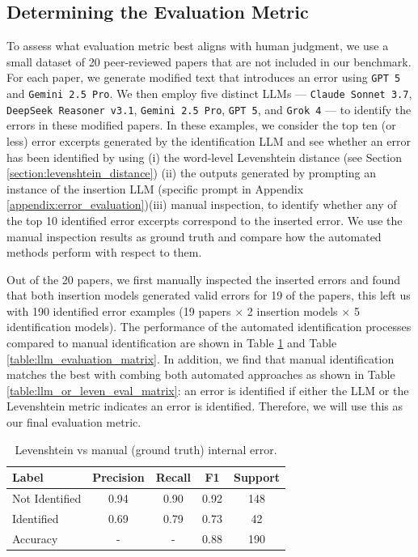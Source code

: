 \documentclass{article}
\newcommand{\gemini}{\texttt{Gemini 2.5 Pro}}
\newcommand{\gpt}{\texttt{GPT 5}}
\newcommand{\grok}{\texttt{Grok 4}}
\newcommand{\deepseek}{\texttt{DeepSeek Reasoner v3.1}}
\begin{document}
\begin{appendix}
\section{Determining the Evaluation Metric}
\label{appendix:preliminary_eval_exp}

To assess what evaluation metric best aligns with human judgment, we use a small dataset of 20 peer-reviewed papers that are not included in our benchmark. For each paper, we generate modified text that introduces an error using \gpt{} and \gemini{}. We then employ five distinct LLMs --- \texttt{Claude Sonnet 3.7}, \deepseek{},  \gemini{}, \gpt{}, and \grok{} --- to identify the errors in these modified papers. In these examples, we consider the top ten (or less) error excerpts generated by the identification LLM and see whether an error has been identified by using (i) the word-level Levenshtein distance (see Section \ref{section:levenshtein_distance}) (ii) the outputs generated by prompting an instance of the insertion LLM (specific prompt in Appendix \ref{appendix:error_evaluation})(iii) manual inspection, to identify whether any of the top 10 identified error excerpts correspond to the inserted error. We use the manual inspection results as ground truth and compare how the automated methods perform with respect to them. 

Out of the 20 papers, we first manually inspected the inserted errors and found that both insertion models generated valid errors for 19 of the papers, this left us with 190 identified error examples (19 papers $\times$ 2 insertion models $\times$ 5 identification models). The performance of the automated identification processes compared to manual identification are shown in Table \ref{table:leven_evaluation_matrix} and Table \ref{table:llm_evaluation_matrix}. In addition, we find that manual identification matches the best with combing both automated approaches as shown in Table \ref{table:llm_or_leven_eval_matrix}: an error is identified if either the LLM or the Levenshtein metric indicates an error is identified. Therefore, we will use this as our final evaluation metric. 

\begin{table}[th!]
\centering
\begin{tabular}{lcccc}
\hline
Label & Precision & Recall & F1 & Support \\
\hline
Not Identified & 0.94 & 0.90 & 0.92 & 148 \\
Identified & 0.69 & 0.79 & 0.73 & 42 \\
\hline
Accuracy & - & - & 0.88 & 190 \\
\hline
\end{tabular}
\caption{Levenshtein vs manual (ground truth) internal error. }
\label{table:leven_evaluation_matrix}
\end{table}



\end{appendix}
\end{document}
